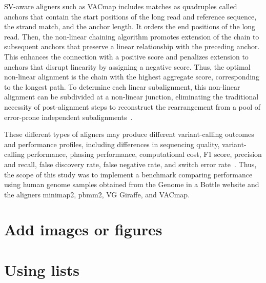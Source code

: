 \documentclass[12pt, letterpaper]{article}
\begin{document}
SV-aware aligners such as VACmap includes matches as quadruples called anchors that contain the start positions of the long read and reference sequence, the strand match, and the anchor length. It orders the end positions of the long read. Then, the non-linear chaining algorithm promotes extension of the chain to subsequent anchors that preserve a linear relationship with the preceding anchor. This enhances the connection with a positive score and penalizes extension to anchors that disrupt linearity by assigning a negative score. Thus, the optimal non-linear alignment is the chain with the highest aggregate score, corresponding to the longest path. To determine each linear subalignment, this non-linear alignment can be subdivided at a non-linear junction, eliminating the traditional necessity of post-alignment steps to reconstruct the rearrangement from a pool of error-prone independent subalignments~\cite{vacmap2025}.

These different types of aligners may produce different variant-calling outcomes and performance profiles, including differences in sequencing quality, variant-calling performance, phasing performance, computational cost, F1 score, precision and recall, false discovery rate, false negative rate, and switch error rate~\cite{Wang2026}. Thus, the scope of this study was to implement a benchmark comparing performance using human genome samples obtained from the Genome in a Bottle website and the aligners minimap2, pbmm2, VG Giraffe, and VACmap.


\section{Add images or figures}


\section{Using lists}
\end{document}
